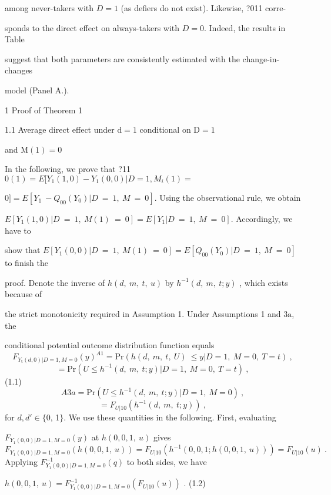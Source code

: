 \documentclass[a4paper,12pt]{article}
\begin{document}
among never-takers with $D = 1$ (as defiers do not exist). Likewise, ?011 corre-

sponds to the direct effect on always-takers with $D=0$. Indeed, the results in Table

suggest that both parameters are consistently estimated with the change-in-changes

model (Panel A.).

1 Proof of Theorem 1

1.1 Average direct effect under $\mathrm{d}=1$ conditional on $\mathrm{D}=1$

and $\mathrm{M}(1)=0$

In the following, we prove that ?11 $0(1) = E[Y_{1}(1,0) -Y_{1}(0,0)|D = 1, M_{i}(1) =$

$0] = E[Y_{1}\ -Q_{00}(Y_{0})|D\ =\ 1,\ M\ =\ 0]$. Using the observational rule, we obtain

$E[Y_{1}(1,0)|D\ =\ 1,\ M(1)\ =\ 0] = E[Y_{1}|D\ =\ 1,\ M\ =\ 0]$. Accordingly, we have to

show that $E[Y_{1}(0,0)|D\ =\ 1,\ M(1)\ =\ 0] = E[Q_{00}(Y_{0})|D\ =\ 1,\ M\ =\ 0]$ to finish the

proof. Denote the inverse of $h(d,\ m,\ t,\ u)$ by $h^{-1}(d,\ m,\ t;y)$ , which exists because of

the strict monotonicity required in Assumption 1. Under Assumptions 1 and $3\mathrm{a}$, the

conditional potential outcome distribution function equals
$$
F_{Y_{\mathrm{t}}(d,0)|D=1,M=0}(y)^{A1}=\mathrm{P}\mathrm{r}(h(d,\ m,\ t,\ U)\ \leq y|D=1,\ M=0,\ T=t)\ ,
$$
$$
=\mathrm{P}\mathrm{r}(U\leq h^{-1}(d,\ m,\ t;y)|D=1,\ M=0,\ T=t)\ ,
$$
(1.1)
$$
A3a=\mathrm{P}\mathrm{r}(U\leq h^{-1}(d,\ m,\ t;y)|D=1,\ M=0)\ ,
$$
$$
=F_{U|10}(h^{-1}(d,\ m,\ t;y))\ ,
$$
for $d, d' \in \{0$, 1$\}$. We use these quantities in the following. First, evaluating

$F_{Y_{1}(0,0)|D=1,M=0}(y)$ at $h(0,0,1,\ u)$ gives
$$
F_{Y_{1}(0,0)|D=1,M=0}(h(0,0,1,\ u))=F_{U|10}(h^{-1}(0,0,1;h(0,0,1,\ u)))=F_{U|10}(u)\ .
$$
Applying $F_{Y_{1}(0,0)|D=1,M=0}^{-1}(q)$ to both sides, we have
\begin{center}
$h(0,0,1,\ u)=F_{Y_{1}(0,0)|D=1,M=0}^{-1}(F_{U|10}(u))$ .   (1.2)
\end{center}
\end{document}
